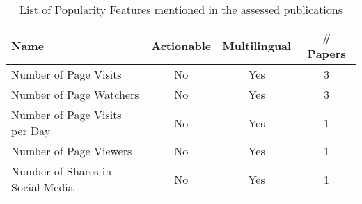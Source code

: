 \begin{table}[htbp]
    \caption{List of Popularity Features mentioned in the assessed publications}
    \label{tab:feat_Popularity}
    \centering
    \begin{tabular}{m{} c c c}
        \toprule
        \textbf{Name} & \textbf{Actionable} & \textbf{Multilingual} & \textbf{\# Papers} \\ 
        \midrule
        Number of Page Visits & No & Yes & 3 \\
        Number of Page Watchers & No & Yes & 3 \\
        Number of Page Visits per Day & No & Yes & 1 \\
        Number of Page Viewers & No & Yes & 1 \\
        Number of Shares in Social Media & No & Yes & 1 \\
        \bottomrule
    \end{tabular}
\end{table}